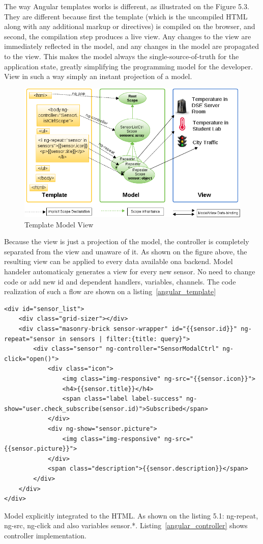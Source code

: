 	The way Angular templates works is different, as illustrated on the Figure 5.3. They are different because first the template (which is the uncompiled HTML along with any additional markup or directives) is compiled on the browser, and second, the compilation step produces a live view. Any changes to the view are immediately reflected in the model, and any changes in the model are propagated to the view. This makes the model always the single-source-of-truth for the application state, greatly simplifying the programming model for the developer. View in such a way simply an instant projection of a model.
	    \begin{figure}[!ht]
		\centering
		\includegraphics[scale=0.6]{images/3wayBinding.png}   
		\caption[Template Model View]{Template Model View}                         
		\end{figure}
        
    Because the view is just a projection of the model, the controller is completely separated from the view and unaware of it. As shown on the figure above, the resulting view can be applied to every data available ona  backend. Model handeler automaticaly generates a view for every new sensor. No need to change code or add new id and dependent handlers, variables, channels.
    The code realization of such a flow are shown on a listing~\ref{angular_template}
    \begin{lstlisting}[label=angular_template,caption=Template registry.html]
<div id="sensor_list">
    <div class="grid-sizer"></div>
    <div class="masonry-brick sensor-wrapper" id="{{sensor.id}}" ng-repeat="sensor in sensors | filter:{title: query}">
        <div class="sensor" ng-controller="SensorModalCtrl" ng-click="open()">
            <div class="icon">
                <img class="img-responsive" ng-src="{{sensor.icon}}">
                <h4>{{sensor.title}}</h4>
                <span class="label label-success" ng-show="user.check_subscribe(sensor.id)">Subscribed</span>
            </div>
            <div ng-show="sensor.picture">
                <img class="img-responsive" ng-src="{{sensor.picture}}">
            </div>
            <span class="description">{{sensor.description}}</span>
        </div>
    </div>
</div>
    \end{lstlisting}
    Model explicitly integrated to the HTML. As shown on the listing 5.1: ng-repeat, ng-src, ng-click and also variables {{sensor.*}}. Listing~\ref{angular_controller} shows controller implementation.

